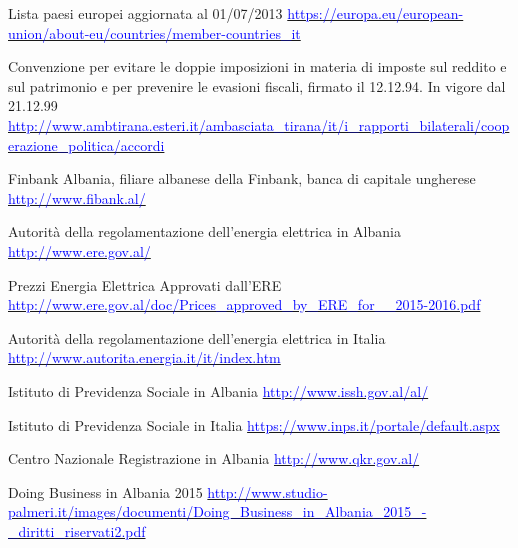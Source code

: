 \begin{thebibliography}{99}

	 Lista paesi europei aggiornata al 01/07/2013 \newline 
			\href{https://europa.eu/european-union/about-eu/countries/member-countries\_it}{\textcolor{blue}{	https://europa.eu/european-union/about-eu/countries/member-countries\_it}}	
	
	 Convenzione per evitare le doppie imposizioni in materia di imposte sul reddito e sul patrimonio e per prevenire le evasioni fiscali, firmato il 12.12.94. In vigore dal 21.12.99 \newline 
			\href{http://www.ambtirana.esteri.it/ambasciata\_tirana/it/i\_rapporti\_bilaterali/cooperazione\_politica/accordi	}{\textcolor{blue}{http://www.ambtirana.esteri.it/ambasciata\_tirana/it/i\_rapporti\_bilaterali/cooperazione\_politica/accordi}}			

	 Finbank Albania, filiare albanese della Finbank, banca di capitale ungherese \newline 
			\href{http://www.fibank.al/}{\textcolor{blue}{http://www.fibank.al/}}			

	 Autorità della regolamentazione dell'energia elettrica in Albania \newline 
			\href{http://www.ere.gov.al/}{\textcolor{blue}{http://www.ere.gov.al/}}

	 Prezzi Energia Elettrica Approvati dall'ERE \newline 
			\href{http://www.ere.gov.al/doc/Prices\_approved\_by\_ERE\_for\_\_2015-2016.pdf}{\textcolor{blue}{http://www.ere.gov.al/doc/Prices\_approved\_by\_ERE\_for\_\_2015-2016.pdf}}

	 Autorità della regolamentazione dell'energia elettrica in Italia \newline 
			\href{http://www.autorita.energia.it/it/index.htm}{\textcolor{blue}{http://www.autorita.energia.it/it/index.htm}}
			
	 Istituto di Previdenza Sociale in Albania\newline 
			\href{http://www.issh.gov.al/al/}{\textcolor{blue}{http://www.issh.gov.al/al/}}	
	
	 Istituto di Previdenza Sociale in Italia\newline 
			\href{https://www.inps.it/portale/default.aspx}{\textcolor{blue}{https://www.inps.it/portale/default.aspx}}

	 Centro Nazionale Registrazione in Albania\newline 
			\href{http://www.qkr.gov.al/}{\textcolor{blue}{http://www.qkr.gov.al/}}

	 Doing Business in Albania 2015\newline 
			\href{http://www.studio-palmeri.it/images/documenti/Doing\_Business\_in\_Albania\_2015\_-\_diritti\_riservati2.pdf}{\textcolor{blue}{http://www.studio-palmeri.it/images/documenti/Doing\_Business\_in\_Albania\_2015\_-\_diritti\_riservati2.pdf}}
	
\end{thebibliography}